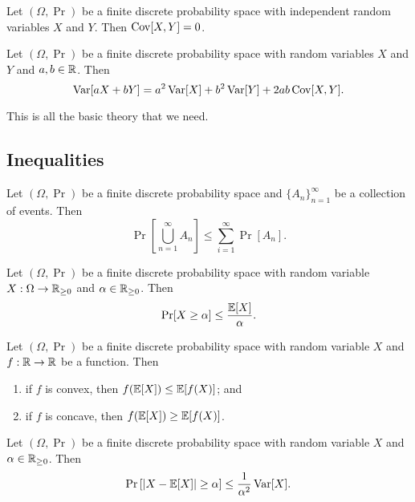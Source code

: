 \begin{proposition}
    Let $(\Omega, \Pr)$ be a finite discrete probability space with independent random variables $X$ and $Y$. Then $\operatorname{Cov}[X, Y] = 0$.
\end{proposition}

\begin{proposition}
    Let $(\Omega, \Pr)$ be a finite discrete probability space with random variables $X$ and $Y$ and $a, b \in \mathbb R$. Then
    \[ \operatorname{Var}[aX+bY] = a^2 \operatorname{Var}[X] + b^2 \operatorname{Var}[Y] + 2ab\operatorname{Cov}[X,Y]. \]
\end{proposition}

This is all the basic theory that we need.

\subsection{Inequalities}

\begin{theorem}
    Let $(\Omega, \Pr)$ be a finite discrete probability space and $\{A_n\}_{n=1}^\infty$ be a collection of events. Then
    \[ \Pr\left[\bigcup_{n=1}^\infty A_n\right] \leq \sum_{i=1}^\infty \Pr[A_n]. \]
\end{theorem}


\begin{theorem}
    Let $(\Omega, \Pr)$ be a finite discrete probability space with random variable $X: \Omega \to \mathbb R_{\geq 0}$ and $\alpha \in \mathbb R_{\geq 0}$. Then
    \[ \Pr[X \geq \alpha] \leq \frac{\mathbb E[X]}{\alpha}. \]
\end{theorem}

\begin{theorem}
    Let $(\Omega, \Pr)$ be a finite discrete probability space with random variable $X$ and $f: \mathbb R \to \mathbb R$ be a function. Then
    \begin{enumerate}
        \item if $f$ is convex, then $f(\mathbb E[X]) \leq \mathbb E[f(X)]$; and
        \item if $f$ is concave, then $f(\mathbb E[X]) \geq \mathbb E[f(X)]$.
    \end{enumerate}
\end{theorem}

\begin{theorem}
    Let $(\Omega, \Pr)$ be a finite discrete probability space with random variable $X$ and $\alpha \in \mathbb R_{\geq 0}$. Then
    \[ 
        \Pr\left[\left\lvert X - \mathbb E[X] \right\rvert \geq \alpha\right] \leq \frac{1}{\alpha^2} \operatorname{Var}[X].    
    \]
\end{theorem}

